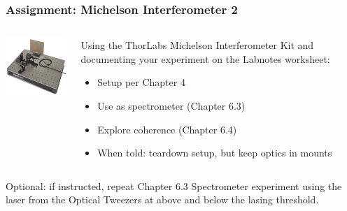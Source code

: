 \documentclass{beamer}
\begin{document}
\begin{frame}\frametitle{Assignment: Michelson Interferometer 2}
\begin{columns}
\begin{column}{5cm}
\begin{center}
\includegraphics[width=4cm]{fig/michelson3.jpg}
\end{center}
\end{column}
\begin{column}{6cm}
Using the ThorLabs Michelson Interferometer Kit and documenting your experiment on the Labnotes worksheet:
\begin{itemize}
\item Setup per Chapter 4
\item Use as spectrometer (Chapter 6.3)
\item Explore coherence (Chapter 6.4)
\item When told: teardown setup, but keep optics in mounts
\end{itemize}
\end{column}
\end{columns}

\vspace{1.0cm}

Optional: if instructed, repeat Chapter 6.3 Spectrometer experiment using the laser from the Optical Tweezers at above and below the lasing threshold.
\end{frame}
\end{document}
